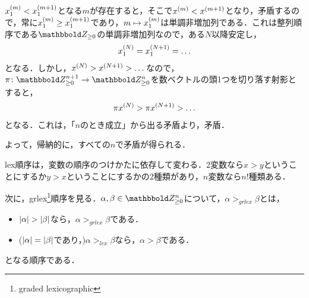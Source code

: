 \documentclass[9pt]{ltjsarticle}
\begin{document}
\begin{myproof}
\begin{itemize}
\begin{itemize}
$x_1^{(m)}<x_1^{(m+1)}$となる$m$が存在すると，そこで$x^{(m)}<x^{(m+1)}$となり，矛盾するので，常に$x_1^{(m)}\ge x_1^{(m+1)}$であり，$m\mapsto x_1^{(m)}$は単調非増加列である．これは整列順序である$\Zge$の単調非増加列なので，ある$N$以降安定し，
\begin{align}
 x_1^{(N)} = x_1^{(N+1)} = \dots
\end{align}
となる．しかし，$x^{(N)}>x^{(N+1)}>\dots$なので，$\pi\colon \Zge^{n+1} \to \Zge^{n}$を数ベクトルの頭1つを切り落す射影とすると，
\begin{align}
 \pi x^{(N)} > \pi x^{(N+1)} > \dots
\end{align}
となる．これは，「$n$のとき成立」から出る矛盾より，矛盾．
\end{itemize}
よって，帰納的に，すべての$n$で矛盾が得られる．
 \end{itemize}
\end{myproof}

lex順序は，変数の順序のつけかたに依存して変わる．2変数なら$x>y$ということにするか$y>x$ということにするかの2種類があり，$n$変数なら$n!$種類ある．

次に，grlex\footnote{graded lexicographic}順序を見る．$\alpha,\beta \in \Zge^n$について，$\alpha >_{grlex} \beta$とは，
\begin{itemize}
 \item $\myabs{\alpha}>\myabs{\beta}$なら，$\alpha >_{grlex}\beta$である．
 \item ($\left|\alpha\right|=\left|\beta\right|$であり，)$\alpha >_{lex} \beta$なら，$\alpha > \beta$である．
\end{itemize}
となる順序である．
\end{document}
